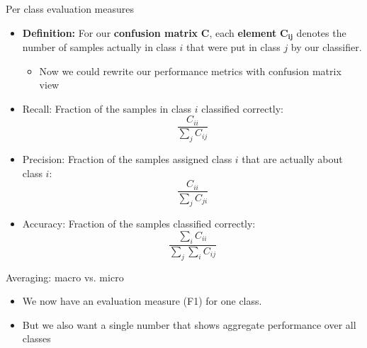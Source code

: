 \documentclass[serif, aspectratio=169]{beamer}
\begin{document}
\begin{frame}{Per class evaluation measures}
    \begin{itemize}
        \item \textbf{Definition:} For our \textbf{confusion matrix} $\mathbf{C}$, each \textbf{element} $\mathbf{C_{ij}}$ denotes the number of samples actually in class $i$ that were put in class $j$ by our classifier.
        \begin{itemize}
            \item Now we could rewrite our performance metrics with confusion matrix view
        \end{itemize}
        \noindent\hrulefill 
        \item Recall: Fraction of the samples in class $i$ classified correctly:
        \[
          \frac{C_{ii}}{\sum _{j} C_{ij}}    
        \]
        \item Precision: Fraction of the samples assigned class $i$ that are actually about class $i$:
        \[
          \frac{C_{ii}}{\sum _{j} C_{ji}}
        \]
        \item Accuracy: Fraction of the samples classified correctly:
        \[
          \frac{\sum _i {C_{ii}}}{\sum _j \sum _i C_{ij}}
        \]
    \end{itemize}
    
\end{frame}
\begin{frame}{Averaging: macro vs. micro}
    \begin{itemize}
        \item We now have an evaluation measure (F1) for one class.
        \item But we also want a single number that shows \textcolor{deepred}{aggregate performance} over all classes
    \end{itemize}
\end{frame}
\end{document}
